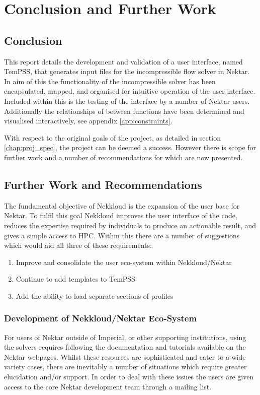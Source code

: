 \documentclass[11pt, a4paper]{report}
\begin{document}
\chapter{Conclusion and Further Work}
\section{Conclusion}
This report details the development and validation of a user interface, named TemPSS, that generates input files for the incompressible flow solver in Nektar. In aim of this the functionality of the incompressible solver has been encapsulated, mapped, and organised for intuitive operation of the user interface. Included within this is the testing of the interface by a number of Nektar users. Additionally the relationships of between functions have been determined and visualised interactively, see appendix \ref{app:constraints}.

With respect to the original goals of the project, as detailed in section \ref{chap:proj_spec}, the project can be deemed a success. However there is scope for further work and a number of recommendations for which are now presented.

\section{Further Work and Recommendations}
The fundamental objective of Nekkloud is the expansion of the user base for Nektar. To fulfil this goal Nekkloud improves the user interface of the code, reduces the expertise required by individuals to produce an actionable result, and gives a simple access to HPC. Within this there are a number of suggestions which would aid all three of these requirements:

\begin{enumerate}
\item Improve and consolidate the user eco-system within Nekkloud/Nektar
\item Continue to add templates to TemPSS
\item Add the ability to load separate sections of profiles
\end{enumerate}

\subsection{Development of Nekkloud/Nektar Eco-System}
For users of Nektar outside of Imperial, or other supporting institutions, using the solvers requires following the documentation and tutorials available on the Nektar webpages. Whilst these resources are sophisticated and cater to a wide variety cases, there are inevitably a number of situations which require greater elucidation and/or support. In order to deal with these issues the users are given access to the core Nektar development team through a mailing list.
\end{document}
